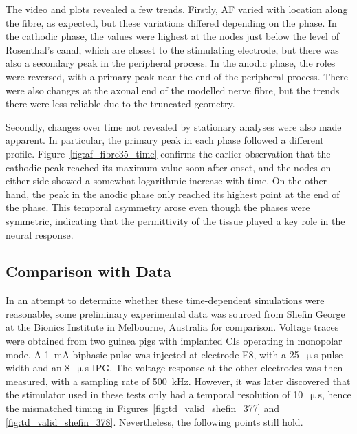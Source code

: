 The video and plots revealed a few trends. Firstly, AF varied with location
along the fibre, as expected, but these variations differed depending on the
phase. In the cathodic phase, the values were highest at the nodes just below
the level of Rosenthal's canal, which are closest to the stimulating electrode,
but there was also a secondary peak in the peripheral process. In the anodic
phase, the roles were reversed, with a primary peak near the end of the
peripheral process. There were also changes at the axonal end of the modelled
nerve fibre, but the trends there were less reliable due to the truncated
geometry.

Secondly, changes over time not revealed by stationary analyses were also made
apparent. In particular, the primary peak in each phase followed a different
profile. Figure~\ref{fig:af_fibre35_time} confirms the earlier observation that
the cathodic peak reached its maximum value soon after onset, and the nodes on
either side showed a somewhat logarithmic increase with time. On the other hand,
the peak in the anodic phase only reached its highest point at the end of the
phase. This temporal asymmetry arose even though the phases were symmetric,
indicating that the permittivity of the tissue played a key role in the neural
response.

\subsection{Comparison with \invivo{} Data}

In an attempt to determine whether these time-dependent simulations were
reasonable, some preliminary experimental data was sourced from Shefin George at
the Bionics Institute in Melbourne, Australia for comparison. Voltage traces
were obtained from two guinea pigs with implanted CIs operating in monopolar
mode. A 1~mA biphasic pulse was injected at electrode E8, with a 25~$ \upmu $s
pulse width and an 8~$ \upmu $s IPG. The voltage response at the other
electrodes was then measured, with a sampling rate of 500~kHz. However, it was
later discovered that the stimulator used in these tests only had a temporal
resolution of 10~$ \upmu $s, hence the mismatched timing in
Figures~\ref{fig:td_valid_shefin_377} and \ref{fig:td_valid_shefin_378}.
Nevertheless, the following points still hold.


